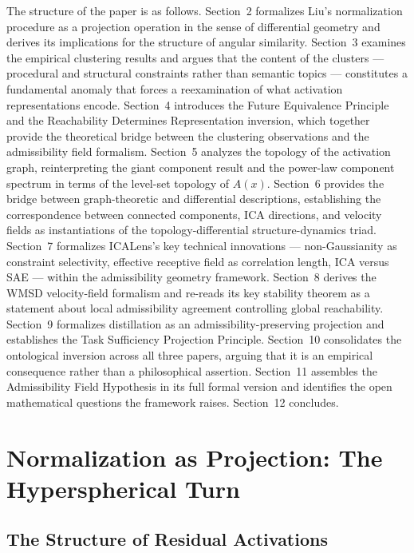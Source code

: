 \documentclass[12pt, a4paper]{article}
\theoremstyle{plain}
\theoremstyle{definition}
\theoremstyle{remark}
\begin{document}
The structure of the paper is as follows. Section~2 formalizes Liu's
normalization procedure as a projection operation in the sense of differential
geometry and derives its implications for the structure of angular similarity.
Section~3 examines the empirical clustering results and argues that the content
of the clusters --- procedural and structural constraints rather than semantic
topics --- constitutes a fundamental anomaly that forces a reexamination of
what activation representations encode. Section~4 introduces the Future
Equivalence Principle and the Reachability Determines Representation
inversion, which together provide the theoretical bridge between the clustering
observations and the admissibility field formalism. Section~5 analyzes the
topology of the activation graph, reinterpreting the giant component result and
the power-law component spectrum in terms of the level-set topology of $A(x)$.
Section~6 provides the bridge between graph-theoretic and differential
descriptions, establishing the correspondence between connected components,
ICA directions, and velocity fields as instantiations of the
topology-differential structure-dynamics triad. Section~7 formalizes ICALens's
key technical innovations --- non-Gaussianity as constraint selectivity,
effective receptive field as correlation length, ICA versus SAE --- within the
admissibility geometry framework. Section~8 derives the WMSD velocity-field
formalism and re-reads its key stability theorem as a statement about local
admissibility agreement controlling global reachability. Section~9 formalizes
distillation as an admissibility-preserving projection and establishes the Task
Sufficiency Projection Principle. Section~10 consolidates the ontological
inversion across all three papers, arguing that it is an empirical consequence
rather than a philosophical assertion. Section~11 assembles the Admissibility
Field Hypothesis in its full formal version and identifies the open mathematical
questions the framework raises. Section~12 concludes.

\section{Normalization as Projection: The Hyperspherical Turn}

\subsection{The Structure of Residual Activations}
\end{document}

